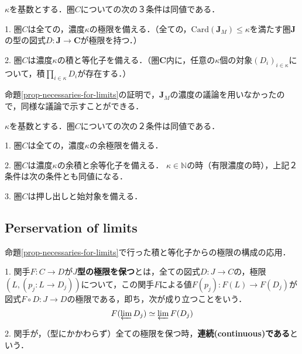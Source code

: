 \documentclass[uplatex, dvipdfmx]{jsarticle}
\begin{document}
\begin{corollary}\label{corollary-necessarilies-for-limits}
    $\kappa$を基数とする．圏$C$についての次の３条件は同値である．

    1. 圏$C$は全ての，濃度$\kappa$の極限を備える．（全ての，$\mathrm{Card}(\mathbf{J}_M)\le\kappa$を満たす圏$\mathbf{J}$の型の図式$D:\mathbf{J}\to\mathbf{C}$が極限を持つ．）

    2. 圏$C$は濃度$\kappa$の積と等化子を備える．（圏$\mathbf{C}$内に，任意の$\kappa$個の対象$(D_i)_{i\in\kappa}$について，積$\prod_{i\in\kappa}D_i$が存在する．）
\end{corollary}
命題\ref{prop-necessaries-for-limits}の証明で，$\mathbf{J}_M$の濃度の議論を用いなかったので，同様な議論で示すことができる．

\begin{theorem}[余極限を持つための条件]
    $\kappa$を基数とする．圏$C$についての次の２条件は同値である．

    1. 圏$C$は全ての，濃度$\kappa$の余極限を備える．

    2. 圏$C$は濃度$\kappa$の余積と余等化子を備える．
    \noindent
    $\kappa\in\mathbb{N}$の時（有限濃度の時），上記２条件は次の条件とも同値になる．

    3. 圏$C$は押し出しと始対象を備える．
\end{theorem}

\subsection{Perservation of limits}
命題\ref{prop-necessaries-for-limits}で行った積と等化子からの極限の構成の応用．

\begin{definition}
    1. 関手$F:C\to D$が\textbf{$J$型の極限を保つ}とは，全ての図式$D:J\to C$の，極限$(L,(p_j:L\to D_j))$について，この関手$F$による値$F(p_j):F(L)\to F(D_j)$が図式$F\circ D:J\to D$の極限である，即ち，次が成り立つことをいう．
    \[ F(\varprojlim D_j)\simeq \varprojlim F(D_j) \]

    2. 関手が，（型にかかわらず）全ての極限を保つ時，\textbf{連続(continuous)である}という．
\end{definition}
\end{document}
